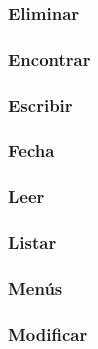 \bigskip
%

\subsubsection{Eliminar}

\bigskip
%

\subsubsection{Encontrar}

\bigskip
%

\subsubsection{Escribir}

\bigskip
%

\subsubsection{Fecha}

\bigskip
%

\subsubsection{Leer}

\bigskip
%

\subsubsection{Listar}

\bigskip
%

\subsubsection{Menús}

\bigskip
%

\subsubsection{Modificar}


